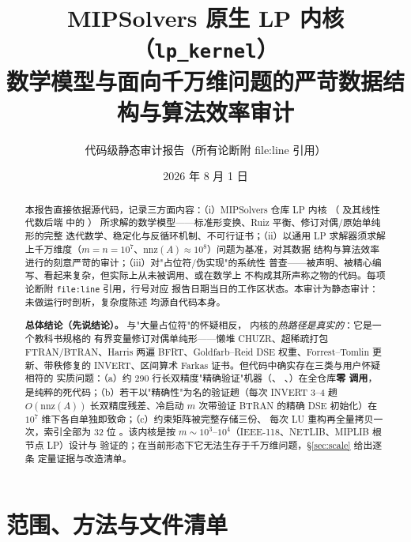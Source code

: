 \documentclass[11pt]{ctexart}
\title{\textbf{MIPSolvers 原生 LP 内核（\texttt{lp\_kernel}）}\\[6pt]
\large 数学模型与面向千万维问题的严苛数据结构与算法效率审计}
\author{代码级静态审计报告（所有论断附 file:line 引用）}
\date{2026 年 8 月 1 日}
\newcommand{\nnz}{\mathrm{nnz}}
\begin{document}
\maketitle

\begin{abstract}
\noindent
本报告直接依据源代码，记录三方面内容：（i）MIPSolvers 仓库 LP 内核
（ 及其线性代数后端
 中的 ）
所求解的数学模型——标准形变换、Ruiz 平衡、修订对偶/原始单纯形的完整
迭代数学、稳定化与反循环机制、不可行证书；（ii）以通用 LP 求解器须求解
上千万维度（$m=n=10^{7}$、$\nnz(A)\approx 10^{8}$）问题为基准，对其数据
结构与算法效率进行的刻意严苛的审计；（iii）对"占位符/伪实现"的系统性
普查——被声明、被精心编写、看起来复杂，但实际上从未被调用、或在数学上
不构成其所声称之物的代码。每项论断附 \texttt{file:line} 引用，行号对应
报告日期当日的工作区状态。本审计为静态审计：未做运行时剖析，复杂度陈述
均源自代码本身。

\medskip
\noindent\textbf{总体结论（先说结论）。} 与"大量占位符"的怀疑相反，
 内核的\emph{热路径是真实的}：它是一个教科书规格的
有界变量修订对偶单纯形——懒堆 CHUZR、超稀疏打包 FTRAN/BTRAN、Harris
两遍 BFRT、Goldfarb--Reid DSE 权重、Forrest--Tomlin 更新、带秩修复的
INVERT、区间算术 Farkas 证书。但代码中确实存在三类与用户怀疑相符的
实质问题：（a）约 290 行长双精度"精确验证"机器（、
、）在全仓库\textbf{零
调用}，是纯粹的死代码；（b）若干以"精确性"为名的验证趟（每次 INVERT
3--4 趟 $O(\nnz(A))$ 长双精度残差、冷启动 $m$ 次带验证 BTRAN 的精确 DSE
初始化）在 $10^{7}$ 维下各自单独即致命；（c）约束矩阵被完整存储三份、
每次 LU 重构再全量拷贝一次，索引全部为 32 位 。该内核是按
$m\sim 10^{3}$--$10^{4}$（IEEE-118、NETLIB、MIPLIB 根节点 LP）设计与
验证的；在当前形态下它无法生存于千万维问题，\S\ref{sec:scale} 给出逐条
定量证据与改造清单。
\end{abstract}

\tableofcontents
\newpage

\section{范围、方法与文件清单}
\end{document}
